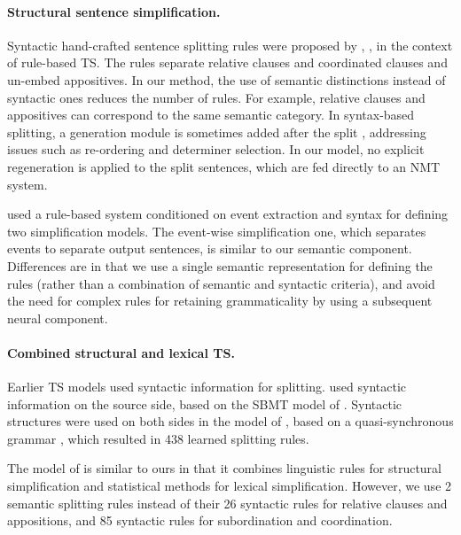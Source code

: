 \documentclass[11pt,a4paper]{article}
\begin{document}
\paragraph{Structural sentence simplification.}
Syntactic hand-crafted sentence splitting rules were proposed by \citet{C96}, \citet{S02}, \citet{S11} in the context of rule-based TS. 
The rules separate relative clauses and coordinated clauses and un-embed appositives. In our method, the use of semantic distinctions instead of syntactic ones reduces the number of rules. For example, relative clauses and appositives can correspond 
to the same semantic category. In syntax-based splitting, a generation module is sometimes added after the split \citep{S04}, addressing issues such as
re-ordering and determiner selection. In our model, no explicit regeneration is applied to the split sentences, which are fed directly to an NMT system.

\citet{GS13} used a rule-based system conditioned on event extraction and syntax for defining two simplification models. 
The event-wise simplification one, which separates events to separate output sentences, is similar to our semantic component. 
Differences are in that we use a single semantic representation for defining the rules (rather than a combination
of semantic and syntactic criteria), and avoid the need for complex rules for retaining grammaticality by using
a subsequent neural component.

\vspace{-0.2cm}
\paragraph{Combined structural and lexical TS.}
Earlier TS models used syntactic information for splitting.
\citet{Z10} used syntactic information on the source side, based on the SBMT model of \citet{YK01}.
Syntactic structures were used on both sides in the model of  \citet{WL11}, based on a quasi-synchronous 
grammar \citep{SE06}, which resulted in 438 learned splitting rules.

The model of \citet{SA14} is similar to ours in that it combines linguistic rules for structural simplification and statistical methods for lexical simplification.
However, we use 2 semantic splitting rules instead of their 26 syntactic rules for relative clauses and appositions, and 85 syntactic rules for subordination and coordination.
\end{document}
